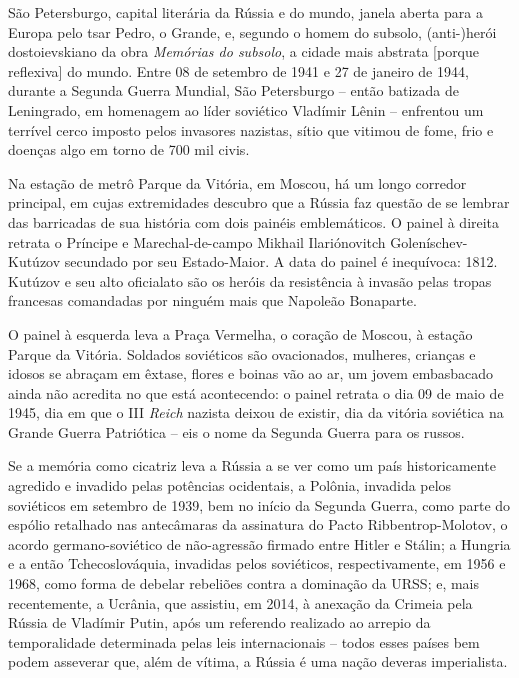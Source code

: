 São Petersburgo, capital literária da Rússia e do mundo, janela aberta
para a Europa pelo tsar Pedro, o Grande, e, segundo o homem do subsolo,
(anti-)herói dostoievskiano da obra \emph{Memórias do subsolo}, a cidade
mais abstrata {[}porque reflexiva{]} do mundo. Entre 08 de setembro de
1941 e 27 de janeiro de 1944, durante a Segunda Guerra Mundial, São
Petersburgo -- então batizada de Leningrado, em homenagem ao líder
soviético Vladímir Lênin -- enfrentou um terrível cerco imposto pelos
invasores nazistas, sítio que vitimou de fome, frio e doenças algo em
torno de 700 mil civis.

Na estação de metrô Parque da Vitória, em Moscou, há um longo corredor
principal, em cujas extremidades descubro que a Rússia faz questão de se
lembrar das barricadas de sua história com dois painéis emblemáticos. O
painel à direita retrata o Príncipe e Marechal-de-campo Mikhail
Ilariónovitch Goleníschev-Kutúzov secundado por seu Estado-Maior. A data
do painel é inequívoca: 1812. Kutúzov e seu alto oficialato são os
heróis da resistência à invasão pelas tropas francesas comandadas por
ninguém mais que Napoleão Bonaparte.

O painel à esquerda leva a Praça Vermelha, o coração de Moscou, à
estação Parque da Vitória. Soldados soviéticos são ovacionados,
mulheres, crianças e idosos se abraçam em êxtase, flores e boinas vão ao
ar, um jovem embasbacado ainda não acredita no que está acontecendo: o
painel retrata o dia 09 de maio de 1945, dia em que o III \emph{Reich}
nazista deixou de existir, dia da vitória soviética na Grande Guerra
Patriótica -- eis o nome da Segunda Guerra para os russos.

Se a memória como cicatriz leva a Rússia a se ver como um país
historicamente agredido e invadido pelas potências ocidentais, a
Polônia, invadida pelos soviéticos em setembro de 1939, bem no início da
Segunda Guerra, como parte do espólio retalhado nas antecâmaras da
assinatura do Pacto Ribbentrop-Molotov, o acordo germano-soviético de
não-agressão firmado entre Hitler e Stálin; a Hungria e a então
Tchecoslováquia, invadidas pelos soviéticos, respectivamente, em 1956 e
1968, como forma de debelar rebeliões contra a dominação da URSS; e,
mais recentemente, a Ucrânia, que assistiu, em 2014, à anexação da
Crimeia pela Rússia de Vladímir Putin, após um referendo realizado ao
arrepio da temporalidade determinada pelas leis internacionais -- todos
esses países bem podem asseverar que, além de vítima, a Rússia é uma
nação deveras imperialista.

